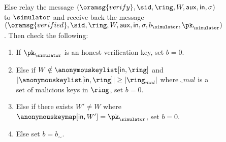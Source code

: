 \begin{figure}
\begin{tcolorbox}[left=2pt,right=2pt]
{\begin{list}{\hspace*{1pt} C}{\setlength\leftmargin{0.15in}}
					\item \label{cond:malicioussignature}Else relay the message $(\oramsg{verify}, \sid, \ring,W,\aux, \msg, \sigma)$ to $ \simulator $ and receive back the message $(\oramsg{verified}, \sid, \ring,W,\aux, \msg, \sigma, b_{\simulator}, \pk_\simulator)$.  Then check the following:
					
					\begin{enumerate}
						\item If   $ \pk_\simulator $ is an honest verification key, set $ b = 0 $. 
						\label{cond:forgery}
						
						\item Else if $ W \notin \anonymouskeylist[\msg,\ring] $ and $ |\anonymouskeylist[\msg, \ring]| \geq |\ring_{mal}| $ where $ \ring_{mal} $ is a set of malicious keys in $ \ring $, set $ b = 0 $.
						\label{cond:uniqueness}
						
						\item Else if there exists $ W' \neq W $ where  $ \anonymouskeymap[\msg,W'] = \pk_\simulator $, set $ b = 0 $. \label{cond:differentWforsamepk} 
						\item Else set $ b = b_\sim$. \label{cond:simulatorbit}
					\end{enumerate}		
					

\end{list}}
\end{tcolorbox}
\end{figure}
